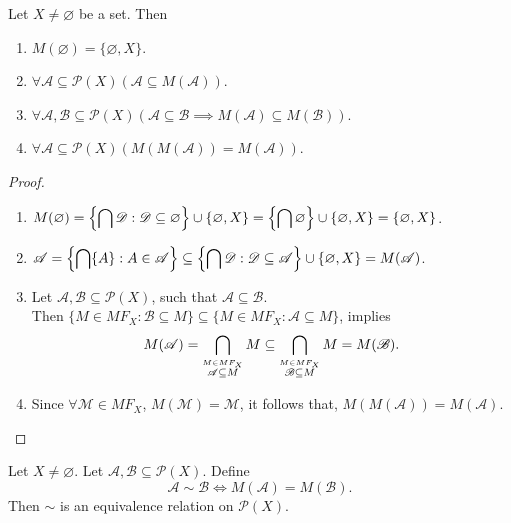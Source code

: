 \documentclass{amsart}
\begin{document}
\begin{prop}
Let \(X \ne \varnothing\) be a set. Then
\begin{enumerate}
\item \(M(\varnothing) = \{\varnothing , X\}\).
\item \(\forall \mathscr{A} \subseteq  \mathscr{P} (X)
(\mathscr{A} \subseteq M(\mathscr{A}))\).
\item \(\forall \mathscr{A} , \mathscr{B} \subseteq \mathscr{P} (X) 
(\mathscr{A} \subseteq \mathscr{B} \implies 
M(\mathscr{A}) \subseteq M(\mathscr{B}))\).
\item \(\forall \mathscr{A} \subseteq \mathscr{P} (X) 
(M(M(\mathscr{A})) = M(\mathscr{A}))\).
\end{enumerate}
\end{prop}
\begin{proof}
\begin{enumerate}
\item \(M(\varnothing) = \left\{\displaystyle\bigcap \mathscr{D} : 
\mathscr{D} \subseteq \varnothing\right\} \cup \{\varnothing ,X\} = 
\left\{\displaystyle\bigcap \varnothing\right\} \cup \{\varnothing ,X\} 
= \{\varnothing ,X\}\).
\item \(\mathscr{A} =
\left\{\displaystyle\bigcap \{A\} : A \in \mathscr{A}\right\} \subseteq 
\left\{\displaystyle\bigcap \mathscr{D} : \mathscr{D} \subseteq \mathscr{A}\right\} 
\cup \{\varnothing ,X\} = M(\mathscr{A})\).
\item Let \(\mathscr{A} , \mathscr{B} \subseteq \mathscr{P}(X)\), such that
\(\mathscr{A} \subseteq \mathscr{B}\). \\ 
Then \(\{M \in MF_X : \mathscr{B} \subseteq M\} \subseteq 
\{M \in MF_X : \mathscr{A} \subseteq M\}\), implies
\[
M(\mathscr{A}) = \displaystyle\bigcap_{\stackrel{M \in MF_X}{\mathscr{A} \subseteq M}} M
\subseteq 
\displaystyle\bigcap_{\stackrel{M \in MF_X}{\mathscr{B} \subseteq M}} M = M(\mathscr{B}).
\]
\item Since \(\forall \mathscr{M} \in MF_X\), \(M(\mathscr{M}) = \mathscr{M}\),
it follows that, \(M(M(\mathscr{A})) = M(\mathscr{A})\).
\end{enumerate}
\end{proof}

\begin{prop}
Let \(X \ne \varnothing\).
Let \(\mathscr{A}, \mathscr{B} \subseteq \mathscr{P} (X)\).
Define 
\[
\mathscr{A} \sim \mathscr{B} \iff M(\mathscr{A}) = M(\mathscr{B}).
\]
Then \(\sim\) is an equivalence relation on \(\mathscr{P} (X)\).
\end{prop}
\end{document}
